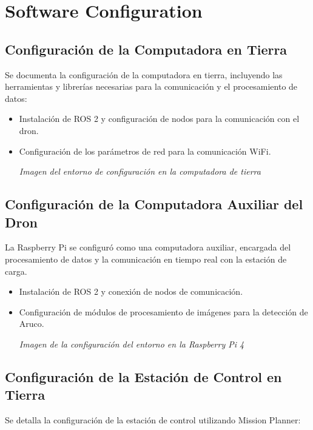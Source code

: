 \section{Software Configuration}

\subsection{Configuración de la Computadora en Tierra} Se documenta la configuración de la computadora en tierra, incluyendo las herramientas y librerías necesarias para la comunicación y el procesamiento de datos:

    \begin{itemize} 
        \item Instalación de ROS 2 y configuración de nodos para la comunicación con el dron. 
        \item Configuración de los parámetros de red para la comunicación WiFi. 
        \begin{center} 
            \textit{Imagen del entorno de configuración en la computadora de tierra} 
        \end{center} 
    \end{itemize}

\subsection{Configuración de la Computadora Auxiliar del Dron} La Raspberry Pi se configuró como una computadora auxiliar, encargada del procesamiento de datos y la comunicación en tiempo real con la estación de carga.

    \begin{itemize} 
        \item Instalación de ROS 2 y conexión de nodos de comunicación. 
        \item Configuración de módulos de procesamiento de imágenes para la detección de Aruco. 
        \begin{center} 
            \textit{Imagen de la configuración del entorno en la Raspberry Pi 4} 
        \end{center} 
    \end{itemize}

\subsection{Configuración de la Estación de Control en Tierra} Se detalla la configuración de la estación de control utilizando Mission Planner:

